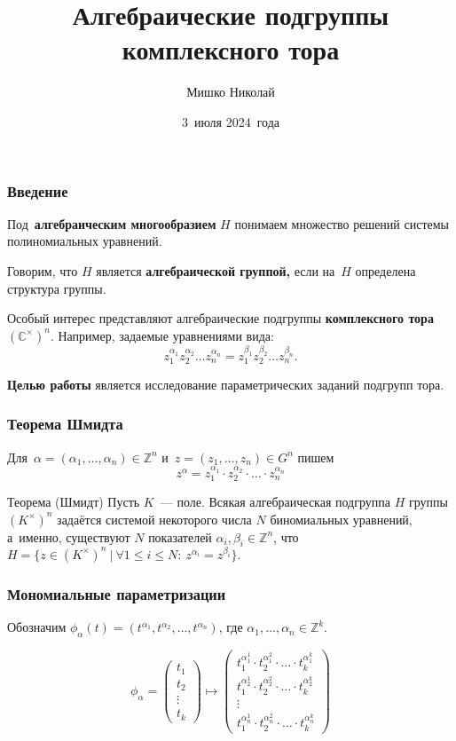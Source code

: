 \documentclass{beamer}
\title{Алгебраические подгруппы комплексного тора}
\author{Мишко Николай}
\institute{Сибирский федеральный университет\\Институт математики и фундаментальной информатики}
\date{3~июля 2024~года}
\newcommand{\Z}{\mathbb{Z}}
\begin{document}
\begin{frame}
  \titlepage
\end{frame}

\begin{frame}
  \frametitle{Введение}

  Под~\textbf{алгебраическим многообразием} $H$ понимаем множество решений системы полиномиальных уравнений.

  Говорим, что $H$ является \textbf{алгебраической группой,} если на~$H$ определена структура группы.

  Особый интерес представляют алгебраические подгруппы \textbf{комплексного тора} $(\mathbb{C}^\times)^n$.
  Например, задаемые уравнениями вида:
  \[
    z_1^{\alpha_1} z_2^{\alpha_2} \ldots z_n^{\alpha_n} = z_1^{\beta_1} z_2^{\beta_2} \ldots z_n^{\beta_n}.
  \]

  \textbf{Целью работы} является исследование параметрических заданий подгрупп тора.
\end{frame}

\begin{frame}
  \frametitle{Теорема Шмидта}

  Для~$\alpha = (\alpha_1, \ldots, \alpha_n) \in \Z^n$ и~$z = (z_1, \ldots, z_n) \in G^n$ пишем
  $$
    z^\alpha = z_1^{\alpha_1} \cdot z_2^{\alpha_2} \cdot \ldots \cdot z_n^{\alpha_n}
  $$

  \begin{block}{Теорема (Шмидт)}
    Пусть $K$~— поле. Всякая алгебраическая подгруппа $H$ группы $(K^{\times})^n$ задаётся
    системой некоторого числа $N$ биномиальных уравнений, а~именно, существуют $N$ показателей $\alpha_i, \beta_i \in \mathbb{Z}^n$, что
    $
        H = \{ z \in (K^{\times})^n\ |\ \forall 1 \leq i \leq N{:}\ z^{\alpha_i} = z^{\beta_i} \}.
    $
  \end{block}
\end{frame}

\begin{frame}
  \frametitle{Мономиальные параметризации}

  Обозначим $\phi_\alpha(t) = (t^{\alpha_1}, t^{\alpha_2}, \ldots, t^{\alpha_n})$,
  где $\alpha_1, \ldots, \alpha_n \in \Z^k$.

  $$
    \phi_\alpha =
    \begin{pmatrix}
        t_1 \\
        t_2 \\
        \vdots \\
        t_k
    \end{pmatrix} \mapsto
    \begin{pmatrix}
        t_1^{\alpha_1^1} \cdot t_2^{\alpha_1^2} \cdot \ldots \cdot t_k^{\alpha_1^k} \\
        t_1^{\alpha_2^1} \cdot t_2^{\alpha_2^2} \cdot \ldots \cdot t_k^{\alpha_2^k} \\
        \vdots \\
        t_1^{\alpha_n^1} \cdot t_2^{\alpha_n^2} \cdot \ldots \cdot t_k^{\alpha_n^k}
    \end{pmatrix}
  $$
\end{frame}
\end{document}

